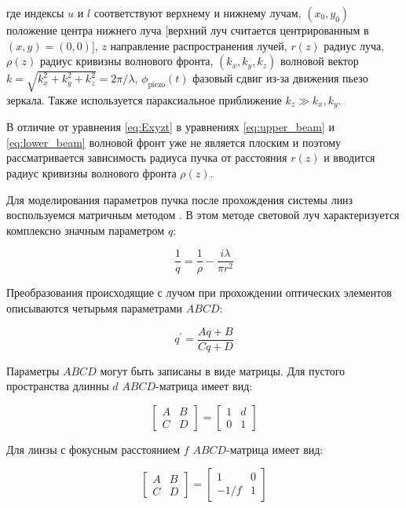 где индексы $u$ и $l$ соответствуют верхнему и нижнему лучам, $(x_0, y_0)$ положение центра нижнего луча [верхний луч считается центрированным в $(x,y)=(0,0)$], $z$ направление распространения лучей, 
$r(z)$ радиус луча, $\rho(z)$ радиус кривизны волнового фронта, $(k_x,k_y,k_z)$ волновой вектор $k=\sqrt{k_x^2+k_y^2+k_z^2}=2\pi/\lambda$, $\phi_{\mathrm{piezo}}(t)$ фазовый сдвиг из-за движения пьезо зеркала. Также используется параксиальное приближение $k_z \gg k_x, k_y$. 

В отличие от уравнения \ref{eq:Exyzt} в уравнениях \ref{eq:upper_beam} и \ref{eq:lower_beam} волновой фронт уже не является плоским и поэтому рассматривается зависимость радиуса пучка от расстояния $r(z)$ и вводится радиус кривизны волнового фронта $\rho(z)$.

Для моделирования параметров пучка после прохождения системы линз воспользуемся матричным методом \cite{gerrard2012introduction}. В этом методе световой луч характеризуется комплексно значным параметром $q$:

\begin{equation}
    \dfrac{1}{q} = \dfrac{1}{\rho} - \dfrac{i \lambda}{\pi r^2}   
\end{equation}

Преобразования происходящие с лучом при прохождении оптических элементов описываются четырьмя параметрами $ABCD$: 

\begin{equation}
    q^{\prime}=\dfrac{A q+B}{C q+D}   
\end{equation}

Параметры $ABCD$ могут быть записаны в виде матрицы. Для пустого пространства длинны $d$ $ABCD$-матрица имеет вид: 

\begin{equation}
    \begin{bmatrix} A & B \\ C & D \end{bmatrix}=\begin{bmatrix} 1 & d \\ 0 & 1 \end{bmatrix}
\end{equation}

Для линзы с фокусным расстоянием $f$ $ABCD$-матрица имеет вид: 

\begin{equation}
    \begin{bmatrix} A & B \\ C & D \end{bmatrix}=\begin{bmatrix} 1 & 0 \\ -1/f & 1 \end{bmatrix}
\end{equation}

